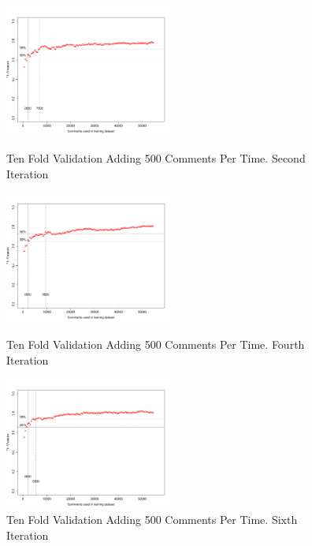 \begin{figure}[thb!]
  \centering
  \vspace{-14mm}
  \includegraphics[width=0.49\textwidth]{figures/appendix/ten_fold_validation_design/ten_fold_validation_1_500.pdf}
  \vspace{-5mm}
  \caption{Ten Fold Validation Adding 500 Comments Per Time. Second Iteration}
  \label{fig:design_ten_fold_validation_1_100}
  \includegraphics[width=0.49\textwidth]{figures/appendix/ten_fold_validation_design/ten_fold_validation_3_500.pdf}
  \vspace{-5mm}
  \caption{Ten Fold Validation Adding 500 Comments Per Time. Fourth Iteration}
  \label{fig:design_ten_fold_validation_3_100}
  \includegraphics[width=0.49\textwidth]{figures/appendix/ten_fold_validation_design/ten_fold_validation_5_500.pdf}
  \vspace{-5mm}
  \caption{Ten Fold Validation Adding 500 Comments Per Time. Sixth Iteration}
  \label{fig:design_ten_fold_validation_5_100}
\end{figure}

